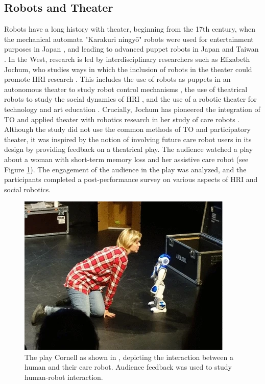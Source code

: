 \documentclass[dissertation,math,vertlayout,pdfa,colorlinks]{aaltoseries}
\begin{document}
\subsection{Robots and Theater}
Robots have a long history with theater, beginning from the 17th century, when the mechanical automata "Karakuri ningyō" robots were used for entertainment purposes in Japan \cite{knightEightLessonsLearned2011}, and leading to advanced puppet robots in Japan \cite{sakashitaYouPuppetEvaluation2017, kawaharaTransformedHumanPresence2016} and Taiwan \cite{huGlovePuppetRobot2008}. In the West, research is led by interdisciplinary researchers such as Elizabeth Jochum, who studies ways in which the inclusion of robots in the theater could promote HRI research \cite{jochumRehearsalRobotRevolution2014, samaniCurtainCreativeRobotics2025}. This includes the use of robots as puppets in an autonomous theater to study robot control mechanisms \cite{jochumRoboticPuppetsEngineering2014}, the use of theatrical robots to study the social dynamics of HRI \cite{katevasRobotComedyLab2015}, and the use of a robotic theater for technology and art education \cite{bravosanchezInteractiveDramaRobots2017,dongChildRobotMusicalTheater2024}. Crucially, Jochum has pioneered the integration of TO and applied theater with robotics research in her study of care robots \cite{jochumUsingTheatreStudy2016}. Although the study did not use the common methods of TO and participatory theater, it was inspired by the notion of involving future care robot users in its design by providing feedback on a theatrical play. The audience watched a play about a woman with short-term memory loss and her assistive care robot (see Figure \ref{fig:cornell}). The engagement of the audience in the play was analyzed, and the participants completed a post-performance survey on various aspects of HRI and social robotics. 

\begin{figure}
    \centering
    \includegraphics[width=0.7\linewidth]{jochum.png}
    \caption{The play Cornell as shown in \cite{jochumUsingTheatreStudy2016}, depicting the interaction between a human and their care robot. Audience feedback was used to study human-robot interaction.}
    \label{fig:cornell}
\end{figure}
\end{document}
